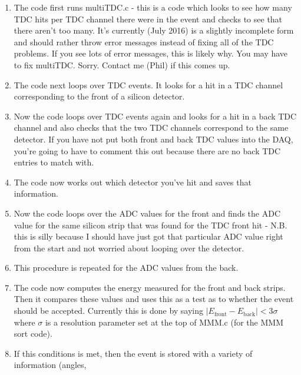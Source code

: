 \documentclass[11pt]{report}
\begin{document}
\begin{enumerate}
 \item The code first runs multiTDC.c - this is a code which looks to see how many TDC hits per TDC channel there were in the event and checks to see that there aren't too many. It's currently (July 2016) is a slightly incomplete form and should rather throw error messages instead of fixing all of the TDC problems. If you see lots of error messages, this is likely why. You may have to fix multiTDC. Sorry. Contact me (Phil) if this comes up.
 
 \item The code next loops over TDC events. It looks for a hit in a TDC channel corresponding to the front of a silicon detector.
 
 \item Now the code loops over TDC events again and looks for a hit in a back TDC channel and also checks that the two TDC channels correspond to the same detector. If you have not put both front and back TDC values into the DAQ, you're going to have to comment this out because there are no back TDC entries to match with.
 
 \item The code now works out which detector you've hit and saves that information.
 
 \item Now the code loops over the ADC values for the front and finds the ADC value for the same silicon strip that was found for the TDC front hit - N.B. this is silly because I should have just got that particular ADC value right from the start and not worried about looping over the detector.
 
 \item This procedure is repeated for the ADC values from the back.
 
 \item The code now computes the energy measured for the front and back strips. Then it compares these values and uses this as a test as to whether the event should be accepted. Currently this is done by saying $|E_{\mathrm{front}} - E_{\mathrm{back}}| < 3\sigma$ where $\sigma$ is a resolution parameter set at the top of MMM.c (for the MMM sort code).
 
 \item If this conditions is met, then the event is stored with a variety of information (angles, 
\end{enumerate}
\end{document}
